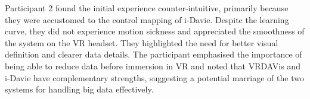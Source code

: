 Participant 2 found the initial experience counter-intuitive, primarily because they were accustomed to the control mapping of i-Davie. 
Despite the learning curve, they did not experience motion sickness and appreciated the smoothness of the system on the VR headset. 
They highlighted the need for better visual definition and clearer data details. 
The participant emphasised the importance of being able to reduce data before immersion in VR and noted that VRDAVis and i-Davie have complementary strengths, suggesting a potential marriage of the two systems for handling big data effectively.







